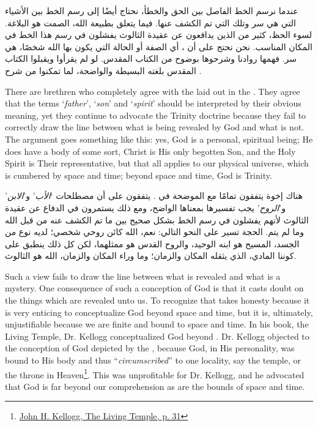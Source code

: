 عندما نرسم الخط الفاصل بين الحق والخطأ، نحتاج أيضًا إلى رسم الخط بين الأشياء التي هي سر وتلك التي تم الكشف عنها. فيما يتعلق بطبيعة الله، الصمت هو البلاغة. لسوء الحظ، كثير من الذين يدافعون عن عقيدة الثالوث يفشلون في رسم هذا الخط في المكان المناسب. نحن نحتج على أن ، أي الصفة أو الحالة التي يكون بها الله شخصًا، هي سر. فهمها روادنا وشرحوها بوضوح من الكتاب المقدس. لو لم يقرأوا ويقبلوا الكتاب المقدس بلغته البسيطة والواضحة، لما تمكنوا من شرح .


There are brethren who completely agree with the  laid out in the . They agree that the terms ‘\textit{father}’, ‘\textit{son}’ and ‘\textit{spirit}’ should be interpreted by their obvious meaning, yet they continue to advocate the Trinity doctrine because they fail to correctly draw the line between what is being revealed by God and what is not. The argument goes something like this: yes, God is a personal, spiritual being; He does have a body of some sort, Christ is His only begotten Son, and the Holy Spirit is Their representative, but that all applies to our physical universe, which is cumbered by space and time; beyond space and time, God is Trinity.


هناك إخوة يتفقون تمامًا مع  الموضحة في . يتفقون على أن مصطلحات ‘\textit{الأب}’ و’\textit{الابن}’ و’\textit{الروح}’ يجب تفسيرها بمعناها الواضح، ومع ذلك يستمرون في الدفاع عن عقيدة الثالوث لأنهم يفشلون في رسم الخط بشكل صحيح بين ما تم الكشف عنه من قبل الله وما لم يتم. الحجة تسير على النحو التالي: نعم، الله كائن روحي شخصي؛ لديه نوع من الجسد، المسيح هو ابنه الوحيد، والروح القدس هو ممثلهما، لكن كل ذلك ينطبق على كوننا المادي، الذي يثقله المكان والزمان؛ وما وراء المكان والزمان، الله هو الثالوث.


Such a view fails to draw the line between what is revealed and what is a mystery. One consequence of such a conception of God is that it casts doubt on the things which are revealed unto us. To recognize that takes honesty because it is very enticing to conceptualize God beyond space and time, but it is, ultimately, unjustifiable because we are finite and bound to space and time. In his book, the Living Temple, Dr. Kellogg conceptualized God beyond . Dr. Kellogg objected to the conception of God depicted by the , because God, in His personality, was bound to His body and thus “\textit{circumscribed}” to one locality, say the temple, or the throne in Heaven\footnote{\href{https://archive.org/details/J.H.Kellogg.TheLivingTemple1903/page/n31/mode/2up}{John H. Kellogg, The Living Temple, p. 31}}. This was unprofitable for Dr. Kellogg, and he advocated that God is far beyond our comprehension as are the bounds of space and time.


